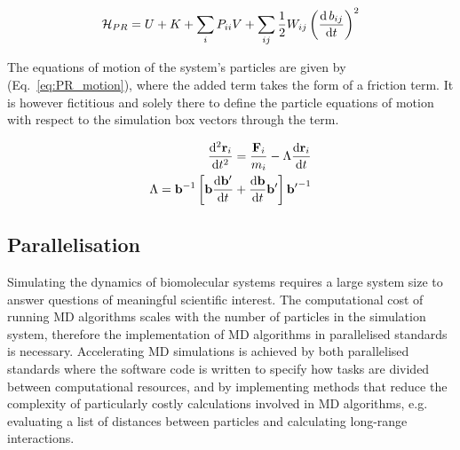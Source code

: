 \begin{equation} \label{eq:PR_hamil}
    \mathcal{H}_{PR} = U + K + \sum_i P_{ii} V + \sum_{ij} \frac{1}{2} W_{ij} \left(\frac{\mathrm{d}\,b_{ij}}{\mathrm{d}t}\right)^2
\end{equation}

The equations of motion of the system's particles are given by (Eq.~\ref{eq:PR_motion}), where the added term takes the form of a friction term. It is however fictitious and solely there to define the particle equations of motion with respect to the simulation box vectors through the term.

\begin{subequations} \label{eq:PR_motion}
\begin{align}
\begin{split}
    \frac{\mathrm{d}^2 \mathbf{r}_i}{\mathrm{d}t^2} = \frac{\mathbf{F}_i}{m_i} - \Lambda \frac{\mathrm{d} \mathbf{r}_i}{\mathrm{d}t}
\end{split}\\
\begin{split}
    \Lambda = \mathbf{b}^{-1} \left[  \mathbf{b} \frac{\mathrm{d}\mathbf{b'}}{\mathrm{d}t} + \frac{\mathrm{d}\mathbf{b}}{\mathrm{d}t} \mathbf{b'} \right] \mathbf{b'}^{-1}
\end{split}
\end{align}
\end{subequations}
%
\subsection{Parallelisation}
Simulating the dynamics of biomolecular systems requires a large system size to answer questions of meaningful scientific interest. The computational cost of running MD algorithms scales with the number of particles in the simulation system, therefore the implementation of MD algorithms in parallelised standards is necessary. Accelerating MD simulations is achieved by both parallelised standards where the software code is written to specify how tasks are divided between computational resources, and by implementing methods that reduce the complexity of particularly costly calculations involved in MD algorithms, e.g. evaluating a list of distances between particles and calculating long-range interactions. 

